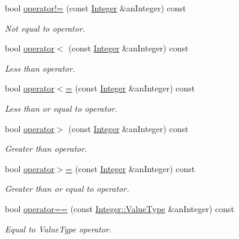 \begin{DoxyCompactItemize}
bool \hyperlink{classostk_1_1core_1_1types_1_1_integer_acd24f2214c622eb2988167d26da9f387}{operator!=} (const \hyperlink{classostk_1_1core_1_1types_1_1_integer}{Integer} \&an\+Integer) const
\begin{DoxyCompactList}\small\item\em Not equal to operator. \end{DoxyCompactList}\item 
bool \hyperlink{classostk_1_1core_1_1types_1_1_integer_ae5b9d102a0e48ea0f10308263a2cec47}{operator$<$} (const \hyperlink{classostk_1_1core_1_1types_1_1_integer}{Integer} \&an\+Integer) const
\begin{DoxyCompactList}\small\item\em Less than operator. \end{DoxyCompactList}\item 
bool \hyperlink{classostk_1_1core_1_1types_1_1_integer_ae8d9f7d15f5f622ef6e6838778864052}{operator$<$=} (const \hyperlink{classostk_1_1core_1_1types_1_1_integer}{Integer} \&an\+Integer) const
\begin{DoxyCompactList}\small\item\em Less than or equal to operator. \end{DoxyCompactList}\item 
bool \hyperlink{classostk_1_1core_1_1types_1_1_integer_a5aa0ea22279bc6c347f7a9eea9770f89}{operator$>$} (const \hyperlink{classostk_1_1core_1_1types_1_1_integer}{Integer} \&an\+Integer) const
\begin{DoxyCompactList}\small\item\em Greater than operator. \end{DoxyCompactList}\item 
bool \hyperlink{classostk_1_1core_1_1types_1_1_integer_a86ebe2b3979f947ede75b516c60aff6c}{operator$>$=} (const \hyperlink{classostk_1_1core_1_1types_1_1_integer}{Integer} \&an\+Integer) const
\begin{DoxyCompactList}\small\item\em Greater than or equal to operator. \end{DoxyCompactList}\item 
bool \hyperlink{classostk_1_1core_1_1types_1_1_integer_af19a5d010994626e9ee62cbdabf8fda6}{operator==} (const \hyperlink{classostk_1_1core_1_1types_1_1_integer_a76a5f41f78659f116eafaf26cecc3244}{Integer\+::\+Value\+Type} \&an\+Integer) const
\begin{DoxyCompactList}\small\item\em Equal to Value\+Type operator. \end{DoxyCompactList}\item 

\end{DoxyCompactItemize}
